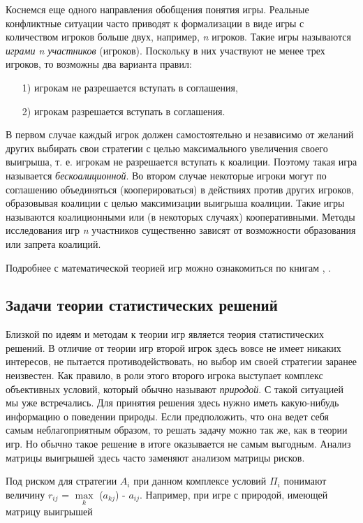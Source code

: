 Коснемся еще одного направления обобщения понятия игры. Реальные конфликтные ситуации часто приводят к формализации в виде игры с количеством игроков больше двух, например, \textit{n} игроков. Такие игры называются \textit{играми n участников} (игроков). Поскольку в них участвуют не менее трех игроков, то возможны два варианта правил:
\begin{enumerate}
\item[1)] игрокам не разрешается вступать в соглашения,
\item[2)] игрокам разрешается вступать в соглашения.
\end{enumerate}

В первом случае каждый игрок должен самостоятельно и независимо от желаний других выбирать свои стратегии с целью максимального увеличения   своего   выигрыша, т. е.  игрокам   не  разрешается  вступать  к коалиции. Поэтому такая игра называется \textit{бескоалиционной}. Во втором случае некоторые игроки могут по соглашению объединяться (кооперироваться) в действиях против других игроков, образовывая коалиции с целью максимизации выигрыша коалиции. Такие игры называются коалиционными или (в некоторых случаях) кооперативными. Методы исследования игр \textit{n} участников существенно зависят от возможности образования или запрета коалиций.

Подробнее с математической теорией игр можно ознакомиться по книгам \cite{literature_krushevsky}, \cite{literature_neiman}.

\subsection{Задачи теории статистических решений}

Близкой по идеям и методам к теории игр является теория статистических решений. В отличие от теории игр второй игрок здесь вовсе не имеет никаких интересов, не пытается противодействовать, но выбор им своей стратегии заранее неизвестен. Как правило, в роли этого второго игрока выступает комплекс объективных условий, который обычно называют \textit{природой}. С такой ситуацией мы уже встречались. Для принятия решения здесь нужно иметь какую-нибудь информацию о поведении природы. Если предположить, что она ведет себя самым неблагоприятным образом, то решать задачу можно так же, как в теории игр. Но обычно такое решение в итоге оказывается не самым выгодным. Анализ матрицы выигрышей здесь часто заменяют анализом матрицы рисков.

Под риском для стратегии $A_i$ при данном комплексе условий $ \Pi_{i}$ понимают величину $r_{ij}$ = $\max\limits_{k}$ ($a_{kj}$) - $a_{ij}$. Например, при игре с природой, имеющей матрицу выигрышей

